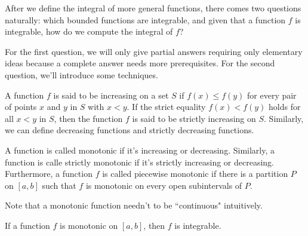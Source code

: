 \documentclass[a4paper]{ctexart}
\begin{document}
	\begin{myrmk}
		After we define the integral of more general functions, there comes two questions naturally: which bounded functions are integrable, and given that a function $f$ is integrable, how do we compute the integral of $f$? 
		
		For the first question, we will only give partial answers requiring only elementary ideas because a complete answer needs more prerequisites. For the second question, we'll introduce some techniques. 
		
	\end{myrmk}
	\begin{mydef}
		A function $f$ is said to be increasing on a set $S$ if $f(x)\le f(y)$ for every pair of points $x$ and $y$ in $S$ with $x<y$. If the strict equality $f(x)<f(y)$ holds for all $x<y$ in $S$, then the function $f$ is said to be strictly increasing on $S$. Similarly, we can define decreasing functions and strictly decreasing functions. 
	\end{mydef}
	\begin{mydef}
		A function is called monotonic if it's increasing or decreasing. Similarly, a function is calle strictly monotonic if it's strictly increasing or decreasing. Furthermore, a function $f$ is called piecewise monotonic if there is a partition $P$ on $[a,b]$ such that $f$ is monotonic on every open subintervals of $P$.
	\end{mydef}
	\begin{myrmk}
		Note that a monotonic function needn't to be ``continuous" intuitively.
	\end{myrmk}
	\begin{mythm}
		If a function $f$ is monotonic on $[a,b]$, then $f$ is integrable.
	\end{mythm}
\end{document}
